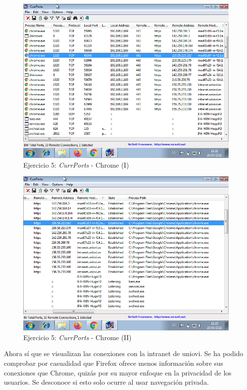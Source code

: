 \documentclass[11pt]{article}
\begin{document}
\begin{figure}[H]
    \caption{Ejercicio 5: \textit{CurrPorts} - Chrome (I)}
  \centering
    \includegraphics[scale=0.7]{p05/e5-4.png}
\end{figure}

\begin{figure}[H]
    \caption{Ejercicio 5: \textit{CurrPorts} - Chrome (II)}
  \centering
    \includegraphics[scale=0.7]{p05/e5-5.png}
\end{figure}

Ahora sí que se visualizan las conexiones con la intranet de uniovi. Se ha podido comprobar por casualidad que Firefox ofrece menos información sobre sus conexiones que Chrome, quizás por su mayor enfoque en la privacidad de los usuarios. Se desconoce si esto solo ocurre al usar navegación privada.
\end{document}
